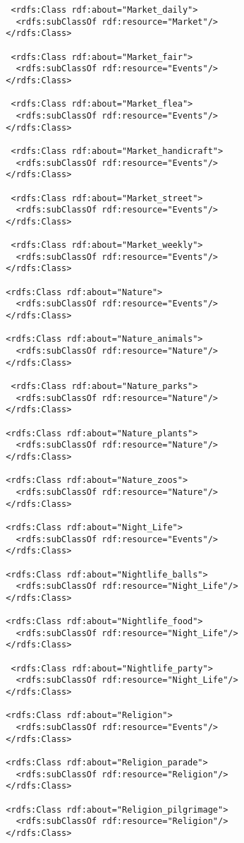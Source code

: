 \begin{verbatim}
   <rdfs:Class rdf:about="Market_daily">
    <rdfs:subClassOf rdf:resource="Market"/>
  </rdfs:Class>
  
   <rdfs:Class rdf:about="Market_fair">
    <rdfs:subClassOf rdf:resource="Events"/>
  </rdfs:Class>
  
   <rdfs:Class rdf:about="Market_flea">
    <rdfs:subClassOf rdf:resource="Events"/>
  </rdfs:Class>
  
   <rdfs:Class rdf:about="Market_handicraft">
    <rdfs:subClassOf rdf:resource="Events"/>
  </rdfs:Class> 
  
   <rdfs:Class rdf:about="Market_street">
    <rdfs:subClassOf rdf:resource="Events"/>
  </rdfs:Class>
  
   <rdfs:Class rdf:about="Market_weekly">
    <rdfs:subClassOf rdf:resource="Events"/>
  </rdfs:Class>
 			
  <rdfs:Class rdf:about="Nature">
    <rdfs:subClassOf rdf:resource="Events"/>
  </rdfs:Class>
  
  <rdfs:Class rdf:about="Nature_animals">
    <rdfs:subClassOf rdf:resource="Nature"/>
  </rdfs:Class>
  
   <rdfs:Class rdf:about="Nature_parks">
    <rdfs:subClassOf rdf:resource="Nature"/>
  </rdfs:Class>
  
  <rdfs:Class rdf:about="Nature_plants">
    <rdfs:subClassOf rdf:resource="Nature"/>
  </rdfs:Class>
  
  <rdfs:Class rdf:about="Nature_zoos">
    <rdfs:subClassOf rdf:resource="Nature"/>
  </rdfs:Class>			
  
  <rdfs:Class rdf:about="Night_Life">
    <rdfs:subClassOf rdf:resource="Events"/>
  </rdfs:Class>
  
  <rdfs:Class rdf:about="Nightlife_balls">
    <rdfs:subClassOf rdf:resource="Night_Life"/>
  </rdfs:Class>
  
  <rdfs:Class rdf:about="Nightlife_food">
    <rdfs:subClassOf rdf:resource="Night_Life"/>
  </rdfs:Class>
  
   <rdfs:Class rdf:about="Nightlife_party">
    <rdfs:subClassOf rdf:resource="Night_Life"/>
  </rdfs:Class>
  			 
  <rdfs:Class rdf:about="Religion">
    <rdfs:subClassOf rdf:resource="Events"/>
  </rdfs:Class>
  
  <rdfs:Class rdf:about="Religion_parade">
    <rdfs:subClassOf rdf:resource="Religion"/>
  </rdfs:Class>
  
  <rdfs:Class rdf:about="Religion_pilgrimage">
    <rdfs:subClassOf rdf:resource="Religion"/>
  </rdfs:Class>
  

\end{verbatim}
